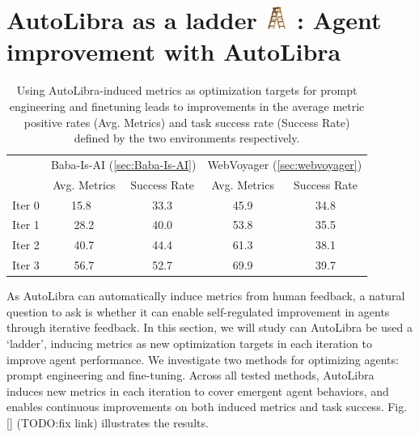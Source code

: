 \section{AutoLibra as a ladder \protect
\includegraphics[height=1em]{figs/ladder.png}
: Agent improvement with AutoLibra}
\label{sec:ladder}

\begin{table}[!h]
	\centering
	\begin{tabular}{rcccc}
		\toprule        & \multicolumn{2}{c}{Baba-Is-AI (\ref{sec:Baba-Is-AI})} & \multicolumn{2}{c}{WebVoyager (\ref{sec:webvoyager})} \\
		                & Avg. Metrics                                          & Success Rate                                         & Avg. Metrics & Success Rate \\
		\midrule Iter 0 & 15.8\                                                 & 33.3                                                 & 45.9         & 34.8         \\
		Iter 1          & 28.2                                                  & 40.0                                                 & 53.8         & 35.5         \\
		Iter 2          & 40.7                                                  & 44.4                                                 & 61.3         & 38.1         \\
		Iter 3          & 56.7                                                  & 52.7                                                 & 69.9         & 39.7         \\
		\bottomrule
	\end{tabular}
	\caption{Using AutoLibra-induced metrics as optimization targets for prompt
	engineering and finetuning leads to improvements in the average metric
	positive rates (Avg. Metrics) and task success rate (Success Rate) defined by the
	two environments respectively.}
	\label{tab:baba_wv_scores}
\end{table}
As AutoLibra can automatically induce metrics from human feedback, a natural
question to ask is whether it can enable self-regulated improvement in agents
through iterative feedback. In this section, we will study can AutoLibra be used
a `ladder', inducing metrics as new optimization targets in each iteration to improve
agent performance. We investigate two methods for optimizing agents: prompt engineering
and fine-tuning. Across all
tested methods, AutoLibra induces new metrics in each iteration to cover
emergent agent behaviors, and enables continuous improvements on both induced
metrics and task success. Fig. \ref{} (TODO:fix link) illustrates the
results.

